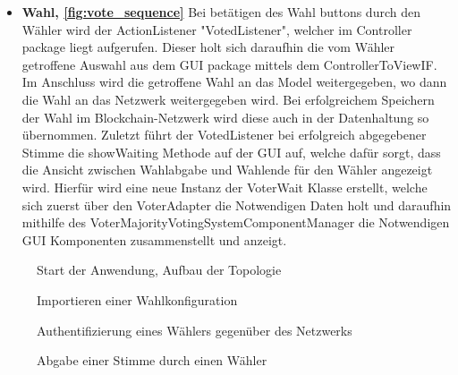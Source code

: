 \documentclass[parskip=full]{scrartcl}
\newcommand{\fakeparagraph}[1]{\textbf{#1}}
\begin{document}
\begin{itemize}
	\item\fakeparagraph{Wahl, \autoref{fig:vote_sequence} } Bei betätigen des Wahl buttons durch den Wähler wird der ActionListener "VotedListener", welcher im Controller package liegt aufgerufen. Dieser holt sich daraufhin die vom Wähler getroffene Auswahl aus dem GUI package mittels dem ControllerToViewIF. Im Anschluss wird die getroffene Wahl an das Model weitergegeben, wo dann die Wahl an das Netzwerk weitergegeben wird. Bei erfolgreichem Speichern der Wahl im Blockchain-Netzwerk wird diese auch in der Datenhaltung so übernommen. Zuletzt führt der VotedListener bei erfolgreich abgegebener Stimme die showWaiting Methode auf der GUI auf, welche dafür sorgt, dass die Ansicht zwischen Wahlabgabe und Wahlende für den Wähler angezeigt wird. Hierfür wird eine neue Instanz der VoterWait Klasse erstellt, welche sich zuerst über den VoterAdapter die Notwendigen Daten holt und daraufhin mithilfe des VoterMajorityVotingSystemComponentManager die Notwendigen GUI Komponenten zusammenstellt und anzeigt.
	
	\end{itemize}
	\newpage
	\pagestyle{empty}
		\begin{figure}
		\centering
		\hspace{-100pt}
		\centerline{}
		\caption{Start der Anwendung, Aufbau der Topologie}
		\label{fig:main_thread}
	\end{figure}

	\newpage
	\begin{figure}
		\centering
		\hspace{-100pt}
		\centerline{}
		\caption{Importieren einer Wahlkonfiguration}
		\label{fig:config_import}
	\end{figure}

	\newpage
	\begin{figure}
		\centering
		\hspace{-100pt}
		\centerline{}
		\caption{Authentifizierung eines Wählers gegenüber des Netzwerks}
		\label{fig:voter_auth}
	\end{figure}

	\newpage
	\begin{figure}
		\centering
		\hspace{-100pt}
		\centerline{}
		\caption{Abgabe einer Stimme durch einen Wähler}
		\label{fig:vote_sequence}
	\end{figure}
\end{document}
